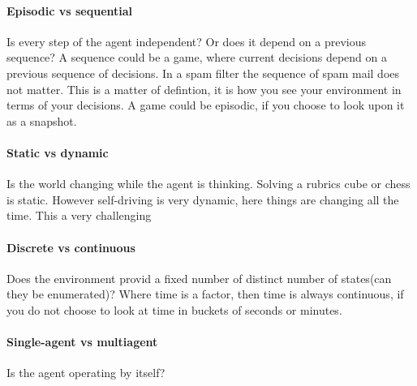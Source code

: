 \documentclass{article}
\begin{document}
\paragraph{Episodic vs sequential}
Is every step of the agent independent? Or does it depend on a previous
sequence? A sequence could be a game, where current decisions depend on a 
previous sequence of decisions. In a spam filter the sequence of spam mail does
not matter.
This is a matter of defintion, it is how you see your environment in terms of
your decisions. A game could be episodic, if you choose to look upon it as a
snapshot.

\paragraph{Static vs dynamic}
Is the world changing while the agent is thinking. Solving a rubrics cube or
chess is static. However self-driving is very dynamic, here things are changing
all the time. This a very challenging 


\paragraph{Discrete vs continuous}
Does the environment provid a fixed number of distinct number of states(can they
be enumerated)? Where time is a factor, then time is always continuous, if you
do not choose to look at time in buckets of seconds or minutes.

\paragraph{Single-agent vs multiagent}%
\label{par:single_agent_vs_multiagent}
Is the agent operating by itself?
\end{document}
